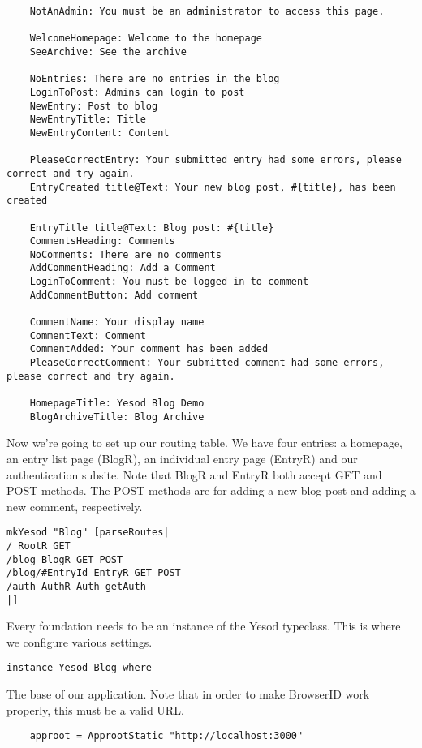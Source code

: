\begin{lstlisting}
    NotAnAdmin: You must be an administrator to access this page.

    WelcomeHomepage: Welcome to the homepage
    SeeArchive: See the archive

    NoEntries: There are no entries in the blog
    LoginToPost: Admins can login to post
    NewEntry: Post to blog
    NewEntryTitle: Title
    NewEntryContent: Content

    PleaseCorrectEntry: Your submitted entry had some errors, please correct and try again.
    EntryCreated title@Text: Your new blog post, #{title}, has been created

    EntryTitle title@Text: Blog post: #{title}
    CommentsHeading: Comments
    NoComments: There are no comments
    AddCommentHeading: Add a Comment
    LoginToComment: You must be logged in to comment
    AddCommentButton: Add comment

    CommentName: Your display name
    CommentText: Comment
    CommentAdded: Your comment has been added
    PleaseCorrectComment: Your submitted comment had some errors, please correct and try again.

    HomepageTitle: Yesod Blog Demo
    BlogArchiveTitle: Blog Archive
\end{lstlisting}

Now we're going to set up our routing table. We have four entries: a homepage, an entry list page (BlogR), an individual entry page (EntryR) and our authentication subsite. Note that BlogR and EntryR both accept GET and POST methods. The POST methods are for adding a new blog post and adding a new comment, respectively.

\begin{lstlisting}
mkYesod "Blog" [parseRoutes|
/ RootR GET
/blog BlogR GET POST
/blog/#EntryId EntryR GET POST
/auth AuthR Auth getAuth
|]
\end{lstlisting}

Every foundation needs to be an instance of the Yesod typeclass. This is where we configure various settings.

\begin{lstlisting}
instance Yesod Blog where
\end{lstlisting}

The base of our application. Note that in order to make BrowserID work properly, this must be a valid URL.

\begin{lstlisting}
    approot = ApprootStatic "http://localhost:3000"
\end{lstlisting}

